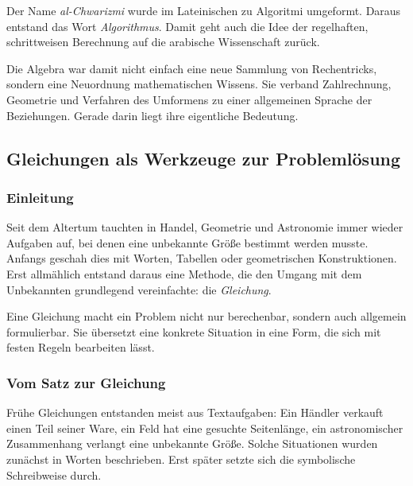 \begin{DidacticBox}
		\label{box:ursprung}
	Der Name \emph{al-Chwarizmi} wurde im Lateinischen zu \glqq Algoritmi\grqq{} umgeformt.
	Daraus entstand das Wort \emph{Algorithmus}.
	Damit geht auch die Idee der regelhaften, schrittweisen Berechnung
	auf die arabische Wissenschaft zurück.

\end{DidacticBox}

Die Algebra war damit nicht einfach eine neue Sammlung von Rechentricks,
sondern eine Neuordnung mathematischen Wissens.
Sie verband Zahlrechnung, Geometrie und Verfahren des Umformens
zu einer allgemeinen Sprache der Beziehungen.
Gerade darin liegt ihre eigentliche Bedeutung.


\subsection{Gleichungen als Werkzeuge zur Problemlösung}
\label{sec:3.2_gleichungen}

\subsubsection*{Einleitung}
Seit dem Altertum tauchten in Handel,
Geometrie und Astronomie
immer wieder Aufgaben auf, bei denen eine unbekannte Größe
bestimmt werden musste.
Anfangs geschah dies mit Worten, Tabellen oder geometrischen Konstruktionen.
Erst allmählich entstand daraus eine Methode,
die den Umgang mit dem Unbekannten grundlegend vereinfachte:
die \emph{Gleichung}.

Eine Gleichung macht ein Problem nicht nur berechenbar,
sondern auch allgemein formulierbar.
Sie übersetzt eine konkrete Situation in eine Form,
die sich mit festen Regeln bearbeiten lässt.

\subsubsection*{Vom Satz zur Gleichung}
Frühe Gleichungen entstanden meist aus Textaufgaben:
Ein Händler verkauft einen Teil seiner Ware,
ein Feld hat eine gesuchte Seitenlänge,
ein astronomischer Zusammenhang verlangt eine unbekannte Größe.
Solche Situationen wurden zunächst in Worten beschrieben.
Erst später setzte sich die symbolische Schreibweise durch.

